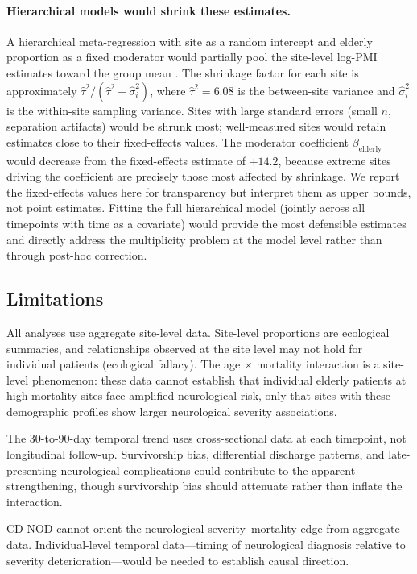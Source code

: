 \documentclass{article}
\begin{document}
\paragraph{Hierarchical models would shrink these estimates.}
A hierarchical meta-regression with site as a random intercept and elderly proportion as a fixed moderator would partially pool the site-level log-PMI estimates toward the group mean \cite{gelman2012multilevel}.
The shrinkage factor for each site is approximately $\hat\tau^2 / (\hat\tau^2 + \hat\sigma_i^2)$, where $\hat\tau^2 = 6.08$ is the between-site variance and $\hat\sigma_i^2$ is the within-site sampling variance.
Sites with large standard errors (small $n$, separation artifacts) would be shrunk most; well-measured sites would retain estimates close to their fixed-effects values.
The moderator coefficient $\beta_{\text{elderly}}$ would decrease from the fixed-effects estimate of $+14.2$, because extreme sites driving the coefficient are precisely those most affected by shrinkage.
We report the fixed-effects values here for transparency but interpret them as upper bounds, not point estimates.
Fitting the full hierarchical model (jointly across all timepoints with time as a covariate) would provide the most defensible estimates and directly address the multiplicity problem at the model level rather than through post-hoc correction.

\subsection{Limitations}

All analyses use aggregate site-level data.
Site-level proportions are ecological summaries, and relationships observed at the site level may not hold for individual patients (ecological fallacy).
The age $\times$ mortality interaction is a site-level phenomenon: these data cannot establish that individual elderly patients at high-mortality sites face amplified neurological risk, only that sites with these demographic profiles show larger neurological severity associations.

The 30-to-90-day temporal trend uses cross-sectional data at each timepoint, not longitudinal follow-up.
Survivorship bias, differential discharge patterns, and late-presenting neurological complications could contribute to the apparent strengthening, though survivorship bias should attenuate rather than inflate the interaction.

CD-NOD cannot orient the neurological severity--mortality edge from aggregate data.
Individual-level temporal data---timing of neurological diagnosis relative to severity deterioration---would be needed to establish causal direction.
\end{document}
